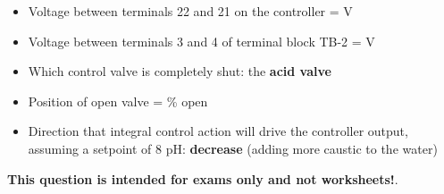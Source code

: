 
\begin{itemize}
\item{} Voltage between terminals 22 and 21 on the controller =  V
\vskip 10pt
\item{} Voltage between terminals 3 and 4 of terminal block TB-2 =  V
\vskip 10pt
\item{} Which control valve is completely shut: the {\bf acid valve}
\vskip 10pt
\item{} Position of open valve = \% open 
\vskip 10pt
\item{} Direction that integral control action will drive the controller output, assuming a setpoint of 8 pH: {\bf decrease} (adding more caustic to the water)
\end{itemize}







{\bf This question is intended for exams only and not worksheets!}.



